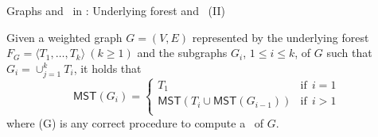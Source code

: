 \begin{frame}{Graphs and \msts\ in \dpm: Underlying forest and \mst\ (II)}
        \begin{proposition}
        Given a weighted graph $G=(V,E)$ represented by the underlying forest 
        $F_G = \langle T_1, \dots, T_k\rangle\ (k \ge 1)$ and the subgraphs $G_i$, $1\leq i\leq k$, of $G$ 
        such that $G_i = \cup_{j=1}^kT_i$, it holds that
            \[
                \mathsf{MST}(G_i) =     \left\{ \begin{array}{lr}
        				                    T_1& \mbox{if}\:\: i = 1 \\ 
        				                    \mathsf{MST}(T_i \cup \mathsf{MST}(G_{i-1})) & \mbox{if}\:\: i > 1 \\
        			                \end{array}\right.
            \]
        where \mst(G) is any correct procedure to compute a \mst\ of $G$.
    \end{proposition}
\end{frame}

